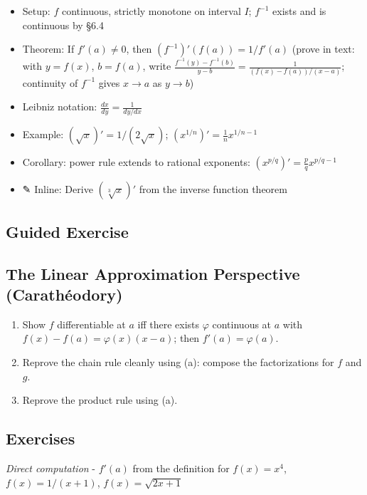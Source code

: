\documentclass[
  10pt,
  letterpaper,
]{scrbook}
\providecommand{\tightlist}{%
  \setlength{\itemsep}{0pt}\setlength{\parskip}{0pt}}
\begin{document}
\begin{itemize}
\tightlist
\item
  Setup: \(f\) continuous, strictly monotone on interval \(I\);
  \(f^{-1}\) exists and is continuous by §6.4
\item
  Theorem: If \(f'(a) \neq 0\), then \((f^{-1})'(f(a)) = 1/f'(a)\)
  (prove in text: with \(y = f(x)\), \(b = f(a)\), write
  \(\frac{f^{-1}(y) - f^{-1}(b)}{y - b} = \frac{1}{(f(x)-f(a))/(x-a)}\);
  continuity of \(f^{-1}\) gives \(x \to a\) as \(y \to b\))
\item
  Leibniz notation: \(\frac{dx}{dy} = \frac{1}{dy/dx}\)
\item
  Example: \((\sqrt{x})' = 1/(2\sqrt{x})\);
  \((x^{1/n})' = \frac{1}{n}x^{1/n - 1}\)
\item
  Corollary: power rule extends to rational exponents:
  \((x^{p/q})' = \frac{p}{q} x^{p/q - 1}\)
\item
  ✎ Inline: Derive \((\sqrt[3]{x})'\) from the inverse function theorem
\end{itemize}

\subsection{Guided Exercise}\label{guided-exercise-15}

\subsection{The Linear Approximation Perspective
(Carathéodory)}\label{the-linear-approximation-perspective-carathuxe9odory}

\begin{enumerate}
\def\labelenumi{(\alph{enumi})}
\item
  Show \(f\) differentiable at \(a\) iff there exists \(\varphi\)
  continuous at \(a\) with \(f(x) - f(a) = \varphi(x)(x - a)\); then
  \(f'(a) = \varphi(a)\).
\item
  Reprove the chain rule cleanly using (a): compose the factorizations
  for \(f\) and \(g\).
\item
  Reprove the product rule using (a).
\end{enumerate}

\subsection{Exercises}\label{exercises-29}

\emph{Direct computation} - \(f'(a)\) from the definition for
\(f(x) = x^4\), \(f(x) = 1/(x+1)\), \(f(x) = \sqrt{2x+1}\)
\end{document}
